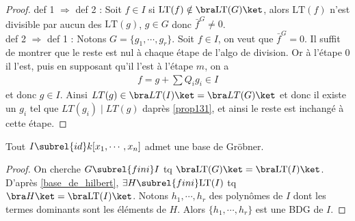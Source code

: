         \begin{proof}
            def 1 $\Rightarrow$ def 2 : Soit $f \in I$ si $\mathrm{LT}(f) \notin \bra \mathrm{LT}(G) \ket$, alors $\mathrm{LT}(f)$ n'est divisible par aucun des $\mathrm{LT}(g)$, $g \in G$ donc $\bar f^G \neq 0$. \\
            def 2 $\Rightarrow$ def 1 : Notons $G = \{g_1, \cdots, g_r\}$. Soit $f \in I$, on veut que $\bar f^G = 0$. Il suffit de montrer que le reste est nul à chaque étape de l'algo de division. Or à l'étape $0$ il l'est, puis en supposant qu'il l'est à l'étape $m$, on a
            \begin{align*}
                f = g + \sum Q_i g_i \in I
            \end{align*}
            et donc $g \in I$. Ainsi $LT(g) \in \bra LT(I) \ket = \bra LT(G) \ket$ et donc il existe un $g_i$ tel que $LT(g_i) \mid LT(g)$ daprès \ref{prop131}, et ainsi le reste est inchangé à cette étape.
        \end{proof}
        \begin{theo}
            Tout $I \subrel{id} k[x_1, \cdots, x_n]$ admet une base de Gröbner.
        \end{theo}
        \begin{proof}
            On cherche $G \subrel{fini} I$ tq $\bra \mathrm{LT}(G) \ket = \bra \mathrm{LT}(I) \ket$. D'après \ref{base_de_hilbert}, $\exists H \subrel{fini} \mathrm{LT}(I)$ tq $\bra H \ket = \bra \mathrm{LT}(I) \ket$. Notons $h_1, \cdots, h_r$ des polynômes de $I$ dont les termes dominants sont les éléments de $H$. Alors $\{h_1, \cdots, h_r\}$ est une BDG de $I$.
        \end{proof}

